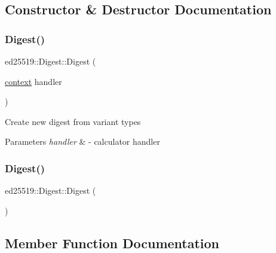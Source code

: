 \subsection{Constructor \& Destructor Documentation}
\mbox{\label{classed25519_1_1_digest_a18beea9fca7dd58df55300dd5e53420d}} 
\subsubsection{\texorpdfstring{Digest()}{Digest()}\hspace{0.1cm}{\footnotesize\ttfamily [1/2]}}
{\footnotesize\ttfamily ed25519\+::\+Digest\+::\+Digest (\begin{DoxyParamCaption}\item[{\mbox{\hyperlink{classed25519_1_1_digest_ae086cdedc0e704dd1d869138648b2d1a}{context}}}]{handler }\end{DoxyParamCaption})}

Create new digest from variant types 
\begin{DoxyParams}{Parameters}
{\em handler} & -\/ calculator handler \\
\hline
\end{DoxyParams}
\mbox{\label{classed25519_1_1_digest_a032b74cccbe09b962b0d148ce6fa9eaa}} 
\subsubsection{\texorpdfstring{Digest()}{Digest()}\hspace{0.1cm}{\footnotesize\ttfamily [2/2]}}
{\footnotesize\ttfamily ed25519\+::\+Digest\+::\+Digest (\begin{DoxyParamCaption}{ }\end{DoxyParamCaption})}



\subsection{Member Function Documentation}
\mbox{\label{classed25519_1_1_digest_a3e74ff17e4b4540bdca27cf1914a4641}} 
